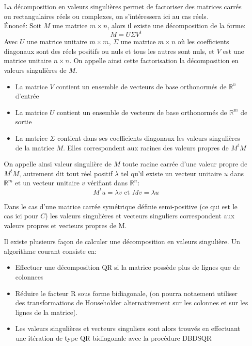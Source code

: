 \documentclass[12pt,french]{article}
\theoremstyle{plain}
\theoremstyle{definition}
\begin{document}
La décomposition en valeurs singulières permet de factoriser des matrices carrés ou rectangulaires réels ou complexes, on s'intéressera ici au cas réels. \\
Énoncé: Soit $M$ une matrice $m \times n$, alors il existe une décomposition de la forme: \\
$$M=U\Sigma V^t$$
Avec $U$ une matrice unitaire $m \times m$, $\Sigma$ une matrice $m\times n$ où les coefficients diagonaux sont des réels positifs ou nuls et tous les autres sont nuls, et $V$ est une matrice unitaire $n \times n$. On appelle ainsi cette factorisation la décomposition en valeurs singulières de $M$.
\begin{itemize}
\item La matrice $V$ contient un ensemble de vecteurs de base orthonormés de $\mathbb{R}^n$ d'entrée
\item La matrice $U$ contient un ensemble de vecteurs de base orthonormés de $\mathbb{R}^m$ de sortie
\item La matrice $\Sigma$ contient dans ses coefficients diagonaux les valeurs singulières de la matrice $M$. Elles correspondent aux racines des valeurs propres de $M^t M$
\end{itemize}

On appelle ainsi valeur singulière de $M$ toute racine carrée d'une valeur propre de $M^t M$, autrement dit tout réel positif $\lambda$ tel qu'il existe un vecteur unitaire $u$ dans $\mathbb{R}^m$ et un vecteur unitaire $v$ vérifiant dans $\mathbb{R}^n$:
$$ M^t u = \lambda v \text{ et } Mv = \lambda u$$

Dans le cas d'une matrice carrée symétrique définie semi-positive (ce qui est le cas ici pour $C$) les valeurs singulières et vecteurs singuliers correspondent aux valeurs propres et vecteurs propres de M.


Il existe plusieurs façon de calculer une décomposition en valeurs singulière. Un algorithme courant consiste en:
\begin{itemize}
\item Effectuer une décomposition QR si la matrice possède plus de lignes que de colonnees
\item Réduire le facteur R sous forme bidiagonale, (on pourra notaement utiliser des transformations de Householder alternativement sur les colonnes et sur les lignes de la matrice).
\item Les valeurs singulières et vecteurs singuliers sont alors trouvés en effectuant une itération de type QR bidiagonale avec la procédure DBDSQR
\end{itemize}
\end{document}
